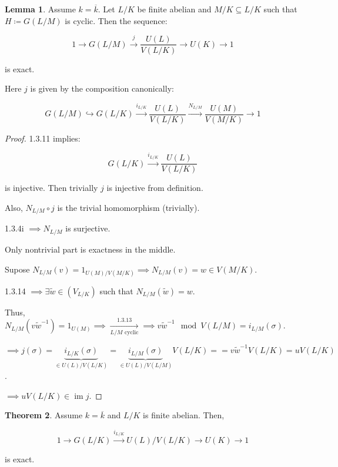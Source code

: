 \documentclass{article}
\theoremstyle{definition}
\newtheorem{theorem}{Theorem}
\numberwithin{theorem}{subsection}
\newtheorem{lemma}[theorem]{Lemma}
\begin{document}
    \begin{lemma}
        Assume \(k = \overline{k}\). Let \(L / K\) be finite abelian and \(M / K \subseteq L / K\) such that \(H \coloneqq G(L / M)\) is cyclic. Then the sequence:

        \[
            1 \to G(L / M) \xrightarrow{j} \frac{U(L)}{V(L / K)} \to U(K) \to 1
        \]

        is exact.

        Here \(j\) is given by the composition canonically:

        \[
            G(L / M) \hookrightarrow G(L / K) \xrightarrow{i_{L / K}} \frac{U(L)}{V(L / K)} \xrightarrow{N_{L / M}} \frac{U(M)}{V(M / K)} \to 1
        \]


    \end{lemma}

    \begin{proof}
        1.3.11 implies:

        \[
            G(L / K) \xrightarrow{i_{L / K}} \frac{U(L)}{V(L / K)}
        \]

        is injective. Then trivially \(j\) is injective from definition.

        Also, \(N_{L / M} \circ j\) is the trivial homomorphism (trivially).

        1.3.4i \(\implies N_{L / M}\) is surjective. 

        Only nontrivial part is exactness in the middle.

        Supose \(N_{L / M}(v) = 1_{U(M) / V(M / K)} \implies N_{L / M}(v) = w \in V(M / K)\).

        1.3.14 \(\implies \exists \widetilde{w} \in (V_{L / K})\) such that \(N_{L / M}(\widetilde{w}) = w\).
        
        Thus, \(N_{L / M}(v \widetilde{w} ^{-1}) = 1_{U(M)} \implies \xrightarrow[L / M \text{ cyclic}]{1.3.13} \implies v \widetilde{w} ^{-1} \mod V(L / M) = i_{L / M}(\sigma)\).
        
        \(\implies j(\sigma) = \underbrace{i_{L / K}(\sigma)}_{\in U(L) / V(L / K)} = \underbrace{i_{L / M}(\sigma)}_{\in U(L) / V(L / M)}V(L / K) =  = v \widetilde{w} ^{-1} V(L / K)= u V(L / K)\).

        \(\implies uV(L / K) \in \operatorname{im} j\). 
        
    \end{proof}

    \begin{theorem}
        Assume \(k = \overline{k}\) and \(L / K\) is finite abelian. Then,

        \[
            1 \to G(L / K) \xrightarrow{i_{L / K}} U(L) / V(L / K) \to U(K) \to 1
        \]

        is exact.
    \end{theorem}
\end{document}
